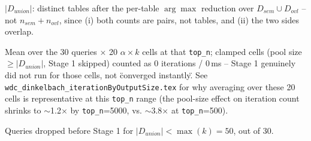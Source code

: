 \begin{table}[t]
\begin{threeparttable}
\begin{tablenotes}
\item[b] $|D_{union}|$: distinct tables after the per-table $\arg\max$ reduction over $D_{sem} \cup D_{ovl}$ -- not $n_{sem}+n_{ovl}$, since (i) both counts are pairs, not tables, and (ii) the two sides overlap.
\item[c] Mean over the 30 queries $\times$ 20 $\alpha{\times}k$ cells at that \texttt{top\_n}; clamped cells (pool size $\geq |D_{union}|$, Stage 1 skipped) counted as 0 iterations / 0\,ms -- Stage 1 genuinely did not run for those cells, not \"converged instantly\". See \texttt{wdc\_dinkelbach\_iterationByOutputSize.tex} for why averaging over these 20 cells is representative at this \texttt{top\_n} range (the pool-size effect on iteration count shrinks to $\sim$1.2$\times$ by \texttt{top\_n}=5000, vs. $\sim$3.8$\times$ at \texttt{top\_n}=500).
\item[d] Queries dropped before Stage 1 for $|D_{union}| < \max(k) = 50$, out of 30.
\end{tablenotes}
\end{threeparttable}
\end{table}

